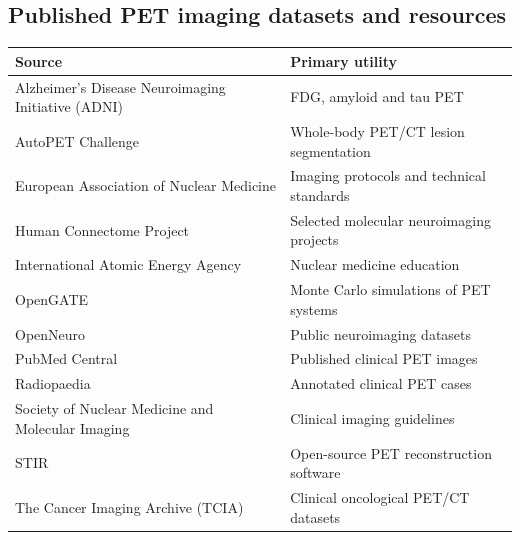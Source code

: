 \subsection{Published PET imaging datasets and resources}
\begin{longtable}{@{}p{}p{}@{}}
\toprule
\textbf{Source} & \textbf{Primary utility} \\
\midrule
Alzheimer's Disease Neuroimaging Initiative (ADNI) & FDG, amyloid and tau PET \\
AutoPET Challenge & Whole-body PET/CT lesion segmentation \\
European Association of Nuclear Medicine & Imaging protocols and technical standards \\
Human Connectome Project & Selected molecular neuroimaging projects \\
International Atomic Energy Agency & Nuclear medicine education \\
OpenGATE & Monte Carlo simulations of PET systems \\
OpenNeuro & Public neuroimaging datasets \\
PubMed Central & Published clinical PET images \\
Radiopaedia & Annotated clinical PET cases \\
Society of Nuclear Medicine and Molecular Imaging & Clinical imaging guidelines \\
STIR & Open-source PET reconstruction software \\
The Cancer Imaging Archive (TCIA) & Clinical oncological PET/CT datasets \\
\bottomrule
\end{longtable}

